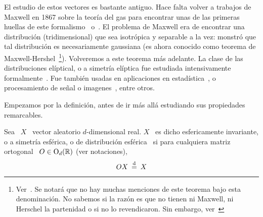 \label{Ssec:MP:FamiliaEliptica}



\label{Ssec:MP:FamiliaElipticaReal}


El estudio de  estos vectores es bastante antiguo. Hace  falta volver a trabajos
de Maxwell en 1867 sobre la teor\'ia del gas para encontrar unas de las primeras
huellas  de  este  formalismo~\cite{Max67} o~\cite[pp.~377--391]{Nie52:v1}.   El
problema de Maxwell era de encontrar una distribuci\'on (tridimensional) que sea
isotr\'opica  y  separable  a  la  vez:  monstr\'o  que  tal  distribuci\'on  es
necesariamente    gaussiana    (es    ahora    conocido    como    teorema    de
Maxwell-Hershel~\footnote{Ver~\cite[Prop.~4.11]{BilBre99}.   Se notar\'a  que no
  hay muchas menciones  de este teorema bajo esta  denominaci\'on. No sabemos si
  la raz\'on es que  no tienen ni Maxwell, ni Herschel la  partenidad o si no lo
  revendicaron.  Sin  embargo, ver~\cite{Max67}}).   Volveremos  a este  teorema
m\'as  adelante. La  clase de  las  distribuciones el\'iptical,  o a  simetr\'ia
el\'iptica  fue   estudiada  intensivamente  formalmente~\cite{Bar34,  Bar34:07,
  Ver64,  McgWag68, CamHua81,  Eat81, Kan94,  Lau75, Yao73,  KotNad04, FanKot90,
  Mui82,    BilBre99}.     Fue    tambi\'en    usadas   en    aplicaciones    en
estad\'istica~\cite{BlaTho68, Chu73, YanKot03,  ArePin06, BauPas07, ChiPas08}, o
procesamiento de  se\~nal o imagenes~\cite{Gol76,  RanWei93, RanWei95, ZozVig10,
  Zoz12}, entre otros.

Empezamos  por  la  definici\'on,  antes  de  ir  m\'as  all\'a  estudiando  sus
propiedades remarcables.

\begin{definicion}
  Sea  \  $X$  \  vector   aleatorio  $d$-dimensional  real.   $X$  \  es  dicho
  esfericamente  invariante,  o a  simetr\'ia  esf\'erica,  o de  distribuci\'on
  esf\'erica \ si  para cualquiera matriz ortogonal \  $O \in \mathrm{O}_d(\mathbb{R})$ (ver
  notaciones),
  \[
  O  X  \: \stackrel{\mathrm{d}}{=}  \: X
  \]
\end{definicion}

